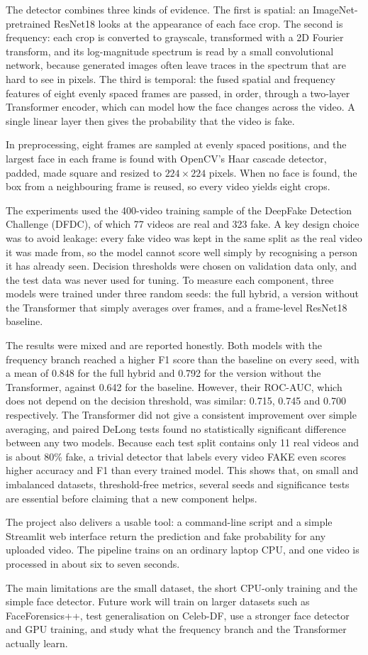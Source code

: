 \documentclass[conference]{IEEEtran}
\begin{document}
The detector combines three kinds of evidence. The first is spatial: an
ImageNet-pretrained ResNet18 looks at the appearance of each face crop. The
second is frequency: each crop is converted to grayscale, transformed with a
2D Fourier transform, and its log-magnitude spectrum is read by a small
convolutional network, because generated images often leave traces in the
spectrum that are hard to see in pixels. The third is temporal: the fused
spatial and frequency features of eight evenly spaced frames are passed, in
order, through a two-layer Transformer encoder, which can model how the face
changes across the video. A single linear layer then gives the probability
that the video is fake.

In preprocessing, eight frames are sampled at evenly spaced positions, and
the largest face in each frame is found with OpenCV's Haar cascade detector,
padded, made square and resized to $224\times224$ pixels. When no face is
found, the box from a neighbouring frame is reused, so every video yields
eight crops.

The experiments used the 400-video training sample of the DeepFake Detection
Challenge (DFDC), of which 77 videos are real and 323 fake. A key design
choice was to avoid leakage: every fake video was kept in the same split as
the real video it was made from, so the model cannot score well simply by
recognising a person it has already seen. Decision thresholds were chosen on
validation data only, and the test data was never used for tuning. To
measure each component, three models were trained under three random seeds:
the full hybrid, a version without the Transformer that simply averages over
frames, and a frame-level ResNet18 baseline.

The results were mixed and are reported honestly. Both models with the
frequency branch reached a higher F1 score than the baseline on every seed,
with a mean of 0.848 for the full hybrid and 0.792 for the version without
the Transformer, against 0.642 for the baseline. However, their ROC-AUC, which
does not depend on the decision threshold, was similar: 0.715, 0.745 and 0.700
respectively. The Transformer did not give a consistent improvement over
simple averaging, and paired DeLong tests found no statistically significant
difference between any two models. Because each test split contains only 11
real videos and is about 80\% fake, a trivial detector that labels every
video FAKE even scores higher accuracy and F1 than every trained model. This
shows that, on small and imbalanced datasets, threshold-free metrics,
several seeds and significance tests are essential before claiming that a
new component helps.

The project also delivers a usable tool: a command-line script and a simple
Streamlit web interface return the prediction and fake probability for any
uploaded video. The pipeline trains on an ordinary laptop CPU, and one video
is processed in about six to seven seconds.

The main limitations are the small dataset, the short CPU-only training and
the simple face detector. Future work will train on larger datasets such as
FaceForensics++, test generalisation on Celeb-DF, use a stronger face
detector and GPU training, and study what the frequency branch and the
Transformer actually learn.
\end{document}
